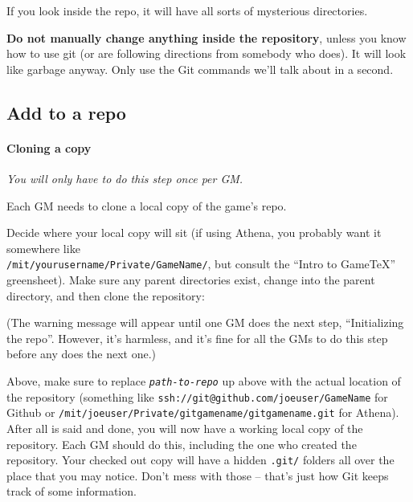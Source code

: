 \documentclass[green]{testgame}
\begin{document}

If you look inside the repo, it will have all sorts of mysterious directories.


\textbf{Do not manually change anything inside the repository}, unless you know how to use git (or are following directions from somebody who does). It will look like garbage anyway. Only use the Git commands we'll talk about in a second.

\subsection{Add \gametex{} to a repo}

\paragraph*{Cloning a copy}

\emph{You will only have to do this step once per GM.}

Each GM needs to clone a local copy of the game's repo.

Decide where your local copy will sit (if using Athena, you probably
want it somewhere like\\ {\tt /mit/yourusername/Private/GameName/},
but consult the ``Intro to GameTeX'' greensheet). Make sure any parent directories exist, change into the parent directory, and then clone the repository:


(The warning message will appear until one GM does the next step, ``Initializing the repo''. However, it's harmless, and it's fine for all the GMs to do this step before any does the next one.)

Above, make sure to replace \texttt{\emph{path-to-repo}} up above with
the actual location of the repository (something like
\texttt{ssh://git@github.com/joeuser/GameName} for Github or
\texttt{/mit/joeuser/Private/gitgamename/gitgamename.git} for Athena).
After all is said and done, you will now have a working local copy of
the repository. Each GM should do this, including the one who created
the repository. Your checked out copy will have a hidden
\texttt{.git/} folders all over the place that you may notice. Don't
mess with those -- that's just how Git keeps track of some
information.
\end{document}
